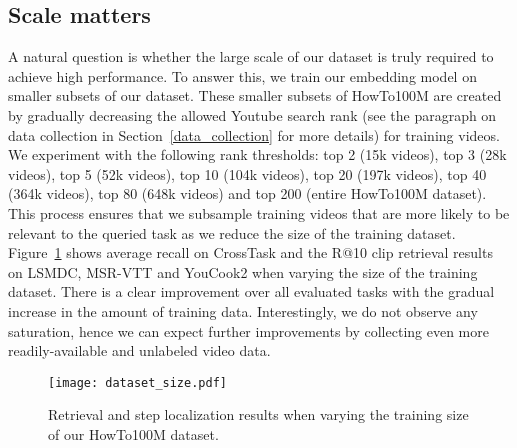 \documentclass[10pt,twocolumn,letterpaper]{article}
\begin{document}
\subsection{Scale matters}
A natural question is whether the large scale of our dataset is truly required to achieve high performance.
To answer this, we train our embedding model on smaller subsets of our dataset.
These smaller subsets of HowTo100M are created by gradually decreasing the allowed Youtube search rank (see the paragraph on data collection in Section~\ref{data_collection} for more details) for training videos.
We experiment with the following rank thresholds: top 2 (15k videos), top 3 (28k videos), top 5 (52k videos), top 10 (104k videos), top 20 (197k videos), top 40 (364k videos), top 80 (648k videos) and top 200 (entire HowTo100M dataset).
This process ensures that we subsample training videos that are more likely to be relevant to the queried task as we reduce the size of the training dataset.
Figure~\ref{fig:dataset_size} shows average recall on CrossTask and the R@10 clip retrieval results on LSMDC, MSR-VTT and YouCook2 when varying the size of the training dataset.
There is a clear improvement over all evaluated tasks with the gradual increase in the amount of training data.
Interestingly, we do not observe any saturation, hence we can expect further improvements by collecting even more readily-available and unlabeled video data.


 \begin{figure}[t]
  \begin{center}
    \texttt{[image: dataset\_size.pdf]}
    \vspace{-.8cm}\\
\end{center}
  \caption{Retrieval and step localization results when varying the training size of our HowTo100M dataset.\vspace{-.3cm}}
  \label{fig:dataset_size}
\end{figure}
\end{document}

